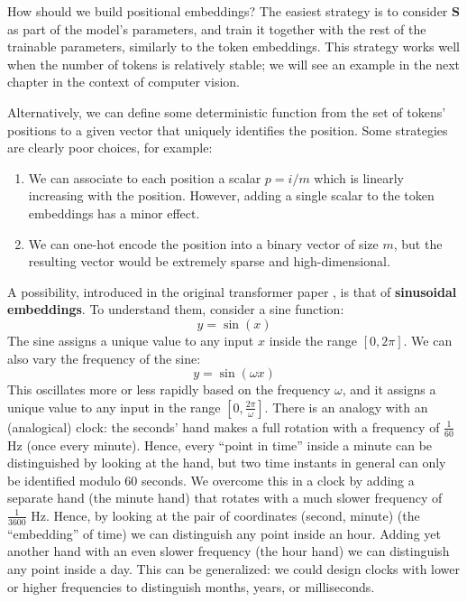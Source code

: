 How should we build positional embeddings? The easiest strategy is to consider $\mathbf{S}$ as part of the model's parameters, and train it together with the rest of the trainable parameters, similarly to the token embeddings. This strategy works well  when the number of tokens is relatively stable; we will see an example in the next chapter in the context of computer vision.

Alternatively, we can define some deterministic function from the set of tokens' positions to a given vector that uniquely identifies the position. Some strategies are clearly poor choices, for example:
%
\begin{enumerate}
\item We can associate to each position a scalar $p=i/m$ which is linearly increasing with the position. However, adding a single scalar to the token embeddings has a minor effect.
\item We can one-hot encode the position into a binary vector of size $m$, but the resulting vector would be extremely sparse and high-dimensional.
\end{enumerate}
%
A possibility, introduced in the original transformer paper \cite{vaswani2017attention}, is that of \textbf{sinusoidal embeddings}. To understand them, consider a sine function:
%
$$
y=\sin(x)
$$
%
The sine assigns a unique value to any input $x$ inside the range $[0, 2\pi]$. We can also vary the frequency of the sine:
%
$$
y=\sin(\omega x)
$$
%
This oscillates more or less rapidly based on the frequency $\omega$, and it assigns a unique value to any input in the range $[0, \frac{2\pi}{\omega}]$. There is an analogy with an (analogical) clock: the seconds' hand makes a full rotation with a frequency of $\frac{1}{60}$ Hz (once every minute). Hence, every “point in time” inside a minute can be distinguished by looking at the hand, but two time instants in general can only be identified modulo 60 seconds. We overcome this in a clock by adding a separate hand (the minute hand) that rotates with a much slower frequency of $\frac{1}{3600}$ Hz. Hence, by looking at the pair of coordinates (second, minute) (the “embedding” of time) we can distinguish any point inside an hour. Adding yet another hand with an even slower frequency (the hour hand) we can distinguish any point inside a day. This can be generalized: we could design clocks with lower or higher frequencies to distinguish months, years, or milliseconds.

